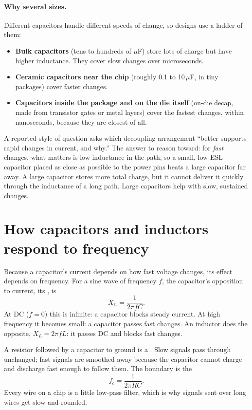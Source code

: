 \paragraph{Why several sizes.} Different capacitors handle different speeds of change, so designs use a ladder of them:
\begin{itemize}
  \item \textbf{Bulk capacitors} (tens to hundreds of $\mu$F) store lots of charge but have higher inductance. They cover slow changes over microseconds.
  \item \textbf{Ceramic capacitors near the chip} (roughly 0.1 to 10\,$\mu$F, in tiny packages) cover faster changes.
  \item \textbf{Capacitors inside the package and on the die itself} (on-die decap, made from transistor gates or metal layers) cover the fastest changes, within nanoseconds, because they are closest of all.
\end{itemize}

\begin{onoa}
A reported style of question asks which decoupling arrangement ``better supports rapid changes in current, and why.'' The answer to reason toward: for \emph{fast} changes, what matters is low inductance in the path, so a small, low-ESL capacitor placed as close as possible to the power pins beats a large capacitor far away. A large capacitor stores more total charge, but it cannot deliver it quickly through the inductance of a long path. Large capacitors help with slow, sustained changes.
\end{onoa}

\section{How capacitors and inductors respond to frequency}

Because a capacitor's current depends on how fast voltage changes, its effect depends on frequency. For a sine wave of frequency $f$, the capacitor's opposition to current, its , is
\[
  X_C = \frac{1}{2\pi f C}.
\]
At DC ($f = 0$) this is infinite: a capacitor blocks steady current. At high frequency it becomes small: a capacitor passes fast changes. An inductor does the opposite, $X_L = 2\pi f L$: it passes DC and blocks fast changes.

A resistor followed by a capacitor to ground is a . Slow signals pass through unchanged; fast signals are smoothed away because the capacitor cannot charge and discharge fast enough to follow them. The boundary is the 
\[
  f_c = \frac{1}{2\pi R C}.
\]
Every wire on a chip is a little low-pass filter, which is why signals sent over long wires get slow and rounded.

